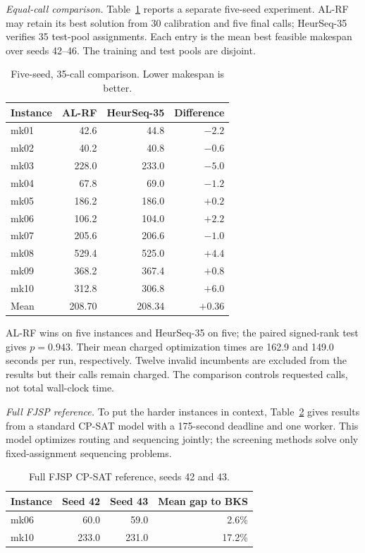 

\textit{Equal-call comparison.} Table~\ref{tab:budget} reports a separate five-seed experiment. AL-RF may retain its best solution from 30 calibration and five final calls; HeurSeq-35 verifies 35 test-pool assignments. Each entry is the mean best feasible makespan over seeds 42--46. The training and test pools are disjoint.

\begin{table}[t]\centering\small
\caption{Five-seed, 35-call comparison. Lower makespan is better.}
\label{tab:budget}
\begin{tabular}{lrrr}\toprule
Instance & AL-RF & HeurSeq-35 & Difference \\ \midrule
mk01 & 42.6 & 44.8 & $-2.2$ \\
mk02 & 40.2 & 40.8 & $-0.6$ \\
mk03 & 228.0 & 233.0 & $-5.0$ \\
mk04 & 67.8 & 69.0 & $-1.2$ \\
mk05 & 186.2 & 186.0 & $+0.2$ \\
mk06 & 106.2 & 104.0 & $+2.2$ \\
mk07 & 205.6 & 206.6 & $-1.0$ \\
mk08 & 529.4 & 525.0 & $+4.4$ \\
mk09 & 368.2 & 367.4 & $+0.8$ \\
mk10 & 312.8 & 306.8 & $+6.0$ \\ \midrule
Mean & 208.70 & 208.34 & $+0.36$ \\ \bottomrule
\end{tabular}
\end{table}

AL-RF wins on five instances and HeurSeq-35 on five; the paired signed-rank test gives $p=0.943$. Their mean charged optimization times are 162.9 and 149.0 seconds per run, respectively. Twelve invalid incumbents are excluded from the results but their calls remain charged. The comparison controls requested calls, not total wall-clock time.

\textit{Full FJSP reference.} To put the harder instances in context, Table~\ref{tab:cp-reference} gives results from a standard CP-SAT model with a 175-second deadline and one worker. This model optimizes routing and sequencing jointly; the screening methods solve only fixed-assignment sequencing problems.

\begin{table}[t]\centering\small
\caption{Full FJSP CP-SAT reference, seeds 42 and 43.}
\label{tab:cp-reference}
\begin{tabular}{lrrr}\toprule
Instance & Seed 42 & Seed 43 & Mean gap to BKS \\ \midrule
mk06 & 60.0 & 59.0 & 2.6\% \\
mk10 & 233.0 & 231.0 & 17.2\% \\ \bottomrule
\end{tabular}
\end{table}
